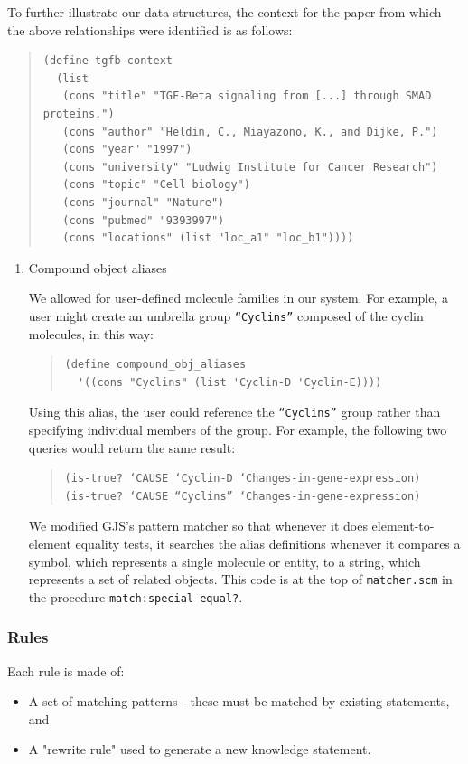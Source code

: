 \documentclass[11pt]{article}
\begin{document}
To further illustrate our data structures, the context for the paper from which the above relationships were identified is as follows:

\begin{quote}
\begin{verbatim}
(define tgfb-context
  (list
   (cons "title" "TGF-Beta signaling from [...] through SMAD proteins.")
   (cons "author" "Heldin, C., Miayazono, K., and Dijke, P.")
   (cons "year" "1997")
   (cons "university" "Ludwig Institute for Cancer Research")
   (cons "topic" "Cell biology")
   (cons "journal" "Nature")
   (cons "pubmed" "9393997")
   (cons "locations" (list "loc_a1" "loc_b1"))))
\end{verbatim}
\end{quote}

\begin{enumerate}
\item Compound object aliases
\label{sec-2-1-1-1}

We allowed for user-defined molecule families in our system. For example, a user might create an umbrella group \texttt{“Cyclins”} composed of the cyclin molecules, in this way:

\begin{quote}
\begin{verbatim}
(define compound_obj_aliases
  '((cons "Cyclins" (list 'Cyclin-D 'Cyclin-E))))
\end{verbatim}
\end{quote}

Using this alias, the user could reference the \texttt{“Cyclins”} group rather than specifying individual members of the group. For example, the following two queries would return the same result:

\begin{quote}
\begin{verbatim}
(is-true? ‘CAUSE ‘Cyclin-D ‘Changes-in-gene-expression)
(is-true? ‘CAUSE “Cyclins” ‘Changes-in-gene-expression)
\end{verbatim}
\end{quote}

We modified GJS’s pattern matcher so that whenever it does element-to-element equality tests, it searches the alias definitions whenever it compares a symbol, which represents a single molecule or entity, to a string, which represents a set of related objects. This code is at the top of \texttt{matcher.scm} in the procedure \texttt{match:special-equal?}.
\end{enumerate}
\subsubsection{Rules}
\label{sec-2-1-2}
Each rule is made of:
\begin{itemize}
\item A set of matching patterns - these must be matched by existing statements, and
\item A "rewrite rule" used to generate a new knowledge statement.
\end{itemize}
\end{document}
